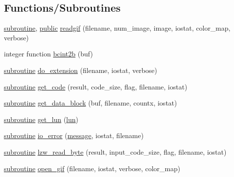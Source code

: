 \subsection*{Functions/\+Subroutines}
\begin{DoxyCompactItemize}
\item 
\hyperlink{M__stopwatch_83_8txt_acfbcff50169d691ff02d4a123ed70482}{subroutine}, \hyperlink{M__stopwatch_83_8txt_a2f74811300c361e53b430611a7d1769f}{public} \hyperlink{namespacem__readgif_a775e2da2a9f54ec308e87a339a393ed6}{readgif} (filename, num\+\_\+image, image, iostat, color\+\_\+map, verbose)
\item 
integer function \hyperlink{namespacem__readgif_a38594ce718f97f844771250edcd5e496}{bcint2b} (buf)
\item 
\hyperlink{M__stopwatch_83_8txt_acfbcff50169d691ff02d4a123ed70482}{subroutine} \hyperlink{namespacem__readgif_a93c5f69ee5054ba2c10ed17b8ab53f6b}{do\+\_\+extension} (filename, iostat, verbose)
\item 
\hyperlink{M__stopwatch_83_8txt_acfbcff50169d691ff02d4a123ed70482}{subroutine} \hyperlink{namespacem__readgif_a027fedbf7ba68763483988c1aa6d2cea}{get\+\_\+code} (result, code\+\_\+size, flag, filename, iostat)
\item 
\hyperlink{M__stopwatch_83_8txt_acfbcff50169d691ff02d4a123ed70482}{subroutine} \hyperlink{namespacem__readgif_ace6e51d0293107696bd1482348414a43}{get\+\_\+data\+\_\+block} (buf, filename, countx, iostat)
\item 
\hyperlink{M__stopwatch_83_8txt_acfbcff50169d691ff02d4a123ed70482}{subroutine} \hyperlink{namespacem__readgif_a7109d632cddcb8d66729d25bbed5c33c}{get\+\_\+lun} (\hyperlink{namespacem__readgif_ae5e05cba63ef3a16c27f9935d6c2a24d}{lun})
\item 
\hyperlink{M__stopwatch_83_8txt_acfbcff50169d691ff02d4a123ed70482}{subroutine} \hyperlink{namespacem__readgif_ae01d3edbe9e15bf4dd33070581e26fee}{io\+\_\+error} (\hyperlink{M__stopwatch_83_8txt_aa4313e9a55405841f95e6550cd87fc3b}{message}, iostat, filename)
\item 
\hyperlink{M__stopwatch_83_8txt_acfbcff50169d691ff02d4a123ed70482}{subroutine} \hyperlink{namespacem__readgif_a314e657d0662360266bac5702a657ef1}{lzw\+\_\+read\+\_\+byte} (result, input\+\_\+code\+\_\+size, flag, filename, iostat)
\item 
\hyperlink{M__stopwatch_83_8txt_acfbcff50169d691ff02d4a123ed70482}{subroutine} \hyperlink{namespacem__readgif_ae008e851af60f4d8fdeeb4fd96b8580d}{open\+\_\+gif} (filename, iostat, verbose, color\+\_\+map)

\end{DoxyCompactItemize}
